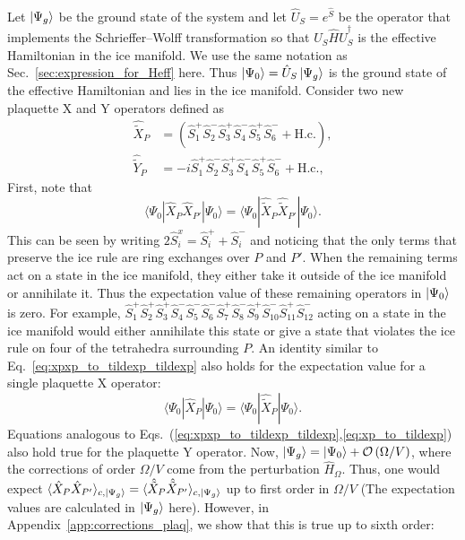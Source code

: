 \documentclass[twocolumn,superscriptaddress,amsmath,amssymb,aps,prx,nofootinbib]{revtex4-2}
\begin{document}
Let $\ket{\Psi_g}$ be the ground state of the system and let $\hat{U}_{S} = e^{\hat{S}}$ be the operator that implements the Schrieffer–Wolff transformation so that $\hat{U}_{S} \hat{H} \hat{U}_{S}^\dagger$ is the effective Hamiltonian in the ice manifold.
We use the same notation as Sec.~\ref{sec:expression_for_Heff} here.
Thus $\ket{\Psi_0} = \hat{U}_S \ket{\Psi_g}$ is the ground state of the effective Hamiltonian and lies in the ice manifold. 
Consider two new plaquette X and Y operators defined as
 \begin{equation} \label{eq:xp_yp_tilde_def}
  \begin{aligned}
    \hat{\tilde{X}}_{P} &=  \left( \hat{S}_1^+ \hat{S}_2^-\hat{S}_3^+\hat{S}_4^-\hat{S}_5^+\hat{S}_6^-   + \text{H.c.} \right) ,\\
      \hat{\tilde{Y}}_{P} & = -i \hat{S}_1^+ \hat{S}_2^-\hat{S}_3^+\hat{S}_4^-\hat{S}_5^+\hat{S}_6^-   + \text{H.c.},
\end{aligned}
\end{equation}
First, note that 
\begin{equation} \label{eq:xpxp_to_tildexp_tildexp}
\langle \Psi_0 | \hat{X}_P \hat{X}_{P'} | \Psi_0 \rangle = \langle \Psi_0  | \hat{\tilde{X}}_P \hat{\tilde{X}}_{P'} | \Psi_0 \rangle. 
\end{equation}
This can be seen by writing $2\hat{S}^x_i  = \hat{S}^+_i + \hat{S}^-_i$ and noticing that the only terms that preserve the ice rule are ring exchanges over $P$ and $P'$.
When the remaining terms act on a state in the ice manifold, they either take it outside of the ice manifold or annihilate it. Thus the  expectation value of these remaining operators in $\ket{\Psi_0}$ is zero. 
For example, $\hat{S}_1^+ \hat{S}_2^+ \hat{S}_3^+ \hat{S}_4^- \hat{S}_5^- \hat{S}_6^- \hat{S}_{7}^+ \hat{S}_{8}^- \hat{S}_{9}^+ \hat{S}_{10}^- \hat{S}_{11}^+ \hat{S}_{12}^{-}$ acting on a state in the ice manifold would either annihilate this state or give a state that violates the ice rule on four of the tetrahedra surrounding $P$.
An identity similar to Eq.~\eqref{eq:xpxp_to_tildexp_tildexp} also holds for the expectation value for a single plaquette X operator:
\begin{equation} \label{eq:xp_to_tildexp}
    \langle \Psi_0 | \hat{X}_P | \Psi_0 \rangle  =  \langle \Psi_0 | \hat{\tilde{X}}_P | \Psi_0 \rangle.
\end{equation}
Equations analogous to Eqs.~(\ref{eq:xpxp_to_tildexp_tildexp},\ref{eq:xp_to_tildexp})
also hold true for the plaquette Y operator. 
Now, $\ket{\Psi_g} = \ket{\Psi_0} + \mathcal{O} \left( \Omega/V \right)$, where the corrections of order $\Omega/V$ come from the perturbation $\hat{H}_\Omega$. Thus, one would expect $ \langle \hat{X}_P \hat{X}_{P'} \rangle_{c, \ket{\Psi_g}} = \langle \hat{\tilde{X}}_P \hat{\tilde{X}}_{P'} \rangle_{c, \ket{\Psi_g}} $ up to first order in $\Omega/V$ (The expectation values are calculated in $\ket{\Psi_g}$ here). However, in Appendix~\ref{app:corrections_plaq}, we show that this is true up to sixth order: 
\end{document}
